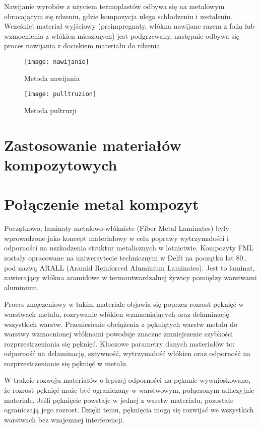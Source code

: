 \documentclass[magister,druk]{dyplom}
\begin{document}
Nawijanie wyrobów z użyciem termoplastów odbywa się na metalowym obracającym się rdzeniu, gdzie kompozycja ulega schłodzeniu i zestaleniu. Wcześniej materiał wyjściowy (preimpregnaty, włókna nawijane razem z folią lub wzmocnienia z włókien mieszanych) jest podgrzewany, następnie odbywa się proces nawijania z dociskiem materiału do rdzenia. 

\begin{figure}[H]
	\texttt{[image: nawijanie]}
	\caption{Metoda nawijania\cite{Chawla1998}}
\end{figure}

\begin{figure}[H]
	\texttt{[image: pulltruzion]}
	\caption{Metoda pultruzji\cite{Chawla1998}}
\end{figure}

\section{Zastosowanie materiałów kompozytowych}
\section{Połączenie metal kompozyt}

Początkowo, laminaty metalowo-włókniste (Fiber Metal Laminates) były wprowadzone jako koncept materiałowy w celu poprawy wytrzymałości i odporności na uszkodzenia struktur metalicznych w lotnictwie. Kompozyty FML zostały opracowane na uniwersytecie technicznym w Delft na początku lat 80., pod nazwą ARALL (Aramid Reinforced Aluminium Laminates). Jest to laminat, zawierający włókna aramidowe w termoutwardzalnej żywicy pomiędzy warstwami aluminium. 

Proces zmęczeniowy w takim materiale objawia się poprzez rozrost pęknięć w warstwach metalu, rozrywanie włókien wzmacniających oraz delaminację wszystkich warstw. Przeniesienie obciążenia z pękniętych warstw metalu do warstwy wzmocnionej włóknami powoduje znaczne zmniejszenie szybkości rozprzestrzeniania się pęknięć. Kluczowe parametry danych materiałów to: odporność na delaminację, sztywność, wytrzymałość włókien  oraz odporność na rozprzestrzenianie się pęknięć w metalu.  

 W trakcie rozwoju materiałów o lepszej odporności na pękanie wywnioskowano, że rozrost pęknięć może być ograniczany w warstwowym, połączonym adhezyjnie materiale. Jeśli pęknięcie powstaje w jednej z warstw materiału, pozostałe ograniczają jego rozrost. Dzięki temu, pęknięcia mogą się rozwijać we wszystkich warstwach bez wzajemnej interferencji. 
\end{document}

